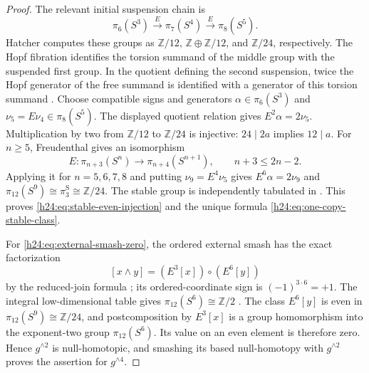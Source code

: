 \begin{proof}
The relevant initial suspension chain is
\[
 \pi_6(S^3)\xrightarrow{E}\pi_7(S^4)
                   \xrightarrow{E}\pi_8(S^5).
\]
Hatcher computes these groups as \(\mathbb Z/12\), \(\mathbb Z\oplus\mathbb Z/12\),
and \(\mathbb Z/24\), respectively.  The Hopf fibration identifies the torsion
summand of the middle group with the suspended first group.  In the
quotient defining the second suspension, twice the Hopf generator of
the free summand is identified with a generator of this torsion summand
\cite[Theorem~5.41(b), p.~573, and pp.~577--578]
{h24:HatcherSpectralSequences}.
Choose compatible signs and generators \(\alpha\in\pi_6(S^3)\) and
\(\nu_5=E\nu_4\in\pi_8(S^5)\).  The displayed quotient relation gives
\(E^2\alpha=2\nu_5\).  Multiplication by two from \(\mathbb Z/12\) to
\(\mathbb Z/24\) is injective: \(24\mid2a\) implies \(12\mid a\).
For \(n\ge5\), Freudenthal gives an isomorphism
\[
 E:\pi_{n+3}(S^n)\longrightarrow\pi_{n+4}(S^{n+1}),
 \qquad n+3\le2n-2.
\]
Applying it for \(n=5,6,7,8\) and putting \(\nu_9=E^4\nu_5\)
gives \(E^6\alpha=2\nu_9\) and
\(\pi_{12}(S^9)\cong\pi_3^{\mathrm S}\cong\mathbb Z/24\).
The stable group is independently tabulated in
\cite[Table~1, p.~113]{h24:IsaksenWangXu2023}.  This proves
\eqref{h24:eq:stable-even-injection} and the unique formula
\eqref{h24:eq:one-copy-stable-class}.

For \eqref{h24:eq:external-smash-zero}, the ordered external smash has the
exact factorization
\[
 [x\wedge y]=(E^3[x])\circ(E^6[y])
\]
by the reduced-join formula
\cite[Proposition~3.1]{h24:Toda1962}; its ordered-coordinate sign is
\((-1)^{3\cdot6}=+1\).  The integral low-dimensional table gives
\(\pi_{12}(S^6)\cong\mathbb Z/2\)
\cite[opening table, p.~339]{h24:Hatcher2002}.  The class \(E^6[y]\) is even in
\(\pi_{12}(S^9)\cong\mathbb Z/24\), and postcomposition by \(E^3[x]\) is a group
homomorphism into the exponent-two group \(\pi_{12}(S^6)\).  Its value on
an even element is therefore zero.  Hence \(g^{\wedge2}\) is
null-homotopic, and smashing its based null-homotopy with
\(g^{\wedge2}\) proves the assertion for \(g^{\wedge4}\).
\end{proof}

